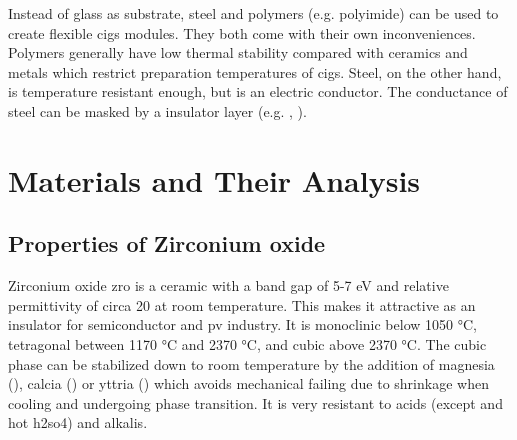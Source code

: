 %
Instead of glass as substrate, steel and polymers (e.g. polyimide\cite{feurer2017cigs}) can be used to create flexible \gls{cigs} modules. 
They both come with their own inconveniences. 
Polymers generally have low thermal stability compared with ceramics and metals which restrict preparation temperatures of \gls{cigs}.
Steel, on the other hand, is temperature resistant enough, but is an electric conductor. 
The conductance of steel can be masked by a insulator layer (e.g. , ).

\pagebreak[4]

\section{Materials and Their Analysis}
\subsection{Properties of Zirconium oxide}
Zirconium oxide \gls{zro} is a ceramic with a band gap of 5-7 eV\cite{Anwar2017} and relative permittivity of circa 20 at room temperature\cite{kukli2001dielectric}. 
This makes it attractive as an insulator for semiconductor and \gls{pv} industry. 
It is monoclinic below 1050 °C, tetragonal between 1170 °C and 2370 °C, and cubic above 2370 °C\cite{Nielsen2005}.
The cubic phase can be stabilized down to room temperature by the addition of magnesia (), calcia () or yttria () which avoids mechanical failing due to shrinkage 
when cooling and undergoing phase transition\cite{Nielsen2005}.
It is very resistant to acids (except  and hot \gls{h2so4}) and alkalis\cite{Nielsen2005}.

